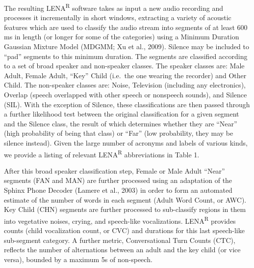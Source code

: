 \documentclass[english,table,man,floatsintext]{apa6}
\begin{document}
The resulting LENA\textsuperscript{R} software takes as input a new audio recording and processes it incrementally in short windows, extracting a variety of acoustic features which are used to classify the audio stream into segments of at least 600 ms in length (or longer for some of the categories) using a Minimum Duration Gaussian Mixture Model (MDGMM; Xu et al., 2009). Silence may be included to \enquote{pad} segments to this minimum duration. The segments are classified according to a set of broad speaker and non-speaker classes. The speaker classes are: Male Adult, Female Adult, \enquote{Key} Child (i.e.~the one wearing the recorder) and Other Child. The non-speaker classes are: Noise, Television (including any electronics), Overlap (speech overlapped with other speech or nonspeech sounds), and Silence (SIL). With the exception of Silence, these classifications are then passed through a further likelihood test between the original classification for a given segment and the Silence class, the result of which determines whether they are \enquote{Near} (high probability of being that class) or \enquote{Far} (low probability, they may be silence instead). Given the large number of acronyms and labels of various kinds, we provide a listing of relevant LENA\textsuperscript{R} abbreviations in Table 1.

After this broad speaker classification step, Female or Male Adult \enquote{Near} segments (FAN and MAN) are further processed using an adaptation of the Sphinx Phone Decoder (Lamere et al., 2003) in order to form an automated estimate of the number of words in each segment (Adult Word Count, or AWC). Key Child (CHN) segments are further processed to sub-classify regions in them into vegetative noises, crying, and speech-like vocalizations. LENA\textsuperscript{R} provides counts (child vocalization count, or CVC) and durations for this last speech-like sub-segment category. A further metric, Conversational Turn Counts (CTC), reflects the number of alternations between an adult and the key child (or vice versa), bounded by a maximum 5s of non-speech.
\end{document}
